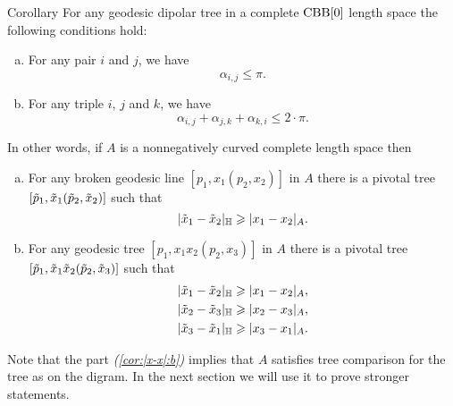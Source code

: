 \begin{thm}{Corollary}\label{cor:|x-x|}
For any geodesic dipolar tree  in a complete $\CBB[0]$ length space the following conditions hold:
\begin{enumerate}[(a)]
\item For any pair $i$ and $j$, we have
\[\alpha_{i,j}\le \pi.\]
\item For any triple $i$, $j$ and $k$,  we have
\[\alpha_{i,j}+\alpha_{j,k}+\alpha_{k,i}\le 2\cdot\pi.\]
\end{enumerate}
In other words, if $A$ is a nonnegatively curved complete length space then
\begin{enumerate}[(a)]
\item\label{cor:|x-x|:a} For any broken geodesic line $[p_1,x_1(p_2,x_2)]$ in  $A$ there is a pivotal tree $[\~p_1,\~x_1(\~p_2,\~x_2)]$ such that 
\[|\~x_1-\~x_2|_{\HH}\ge |x_1-x_2|_A.\]

\item\label{cor:|x-x|:b} For any geodesic tree $[p_1,x_1x_2(p_2,x_3)]$ in $A$ there is a pivotal tree $[\~p_1,\~x_1\~x_2(\~p_2,\~x_3)]$ such that 
\begin{align*}
|\~x_1-\~x_2|_{\HH}&\ge |x_1-x_2|_A,
\\
|\~x_2-\~x_3|_{\HH}&\ge |x_2-x_3|_A,
\\
|\~x_3-\~x_1|_{\HH}&\ge |x_3-x_1|_A.
\end{align*}
\end{enumerate}

\end{thm}
\hide
\begin{wrapfigure}{r}{15 mm}
\end{wrapfigure}
\unhide

Note that the part \textit{(\ref{cor:|x-x|:b})} implies that $A$ satisfies tree comparison for the tree as on the digram. 
In the next section we will use it to prove stronger statements.

